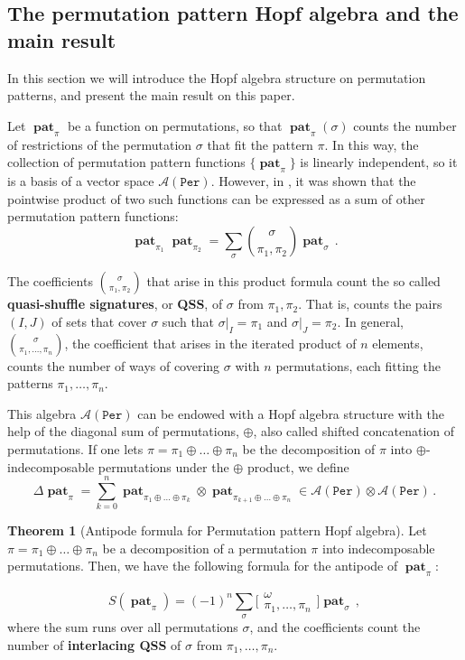 \documentclass[12pt, reqno]{amsart}
\theoremstyle{definition}
\newtheorem{thm}{Theorem}[section]
\DeclareMathOperator{\pat}{\mathbf{pat}}
\begin{document}
\subsection{The permutation pattern Hopf algebra and the main result}

In this section we will introduce the Hopf algebra structure on permutation patterns, and present the main result on this paper.

Let $\pat_{\pi}$ be a function on permutations, so that $\pat_{\pi}(\sigma)$ counts the number of restrictions of the permutation $\sigma$ that fit the pattern $\pi$.
In this way, the collection of permutation pattern functions $\{\pat_{\pi}\}$ is linearly independent, so it is a basis of a vector space $\mathcal A (\mathtt{Per})$.
However, in \cite{Vargas}, it was shown that the pointwise product of two such functions can be expressed as a sum of other permutation pattern functions:
$$\pat_{\pi_1} \pat_{\pi_2} = \sum_{\sigma} \binom{\sigma}{\pi_1, \pi_2} \pat_{\sigma} \, .$$

The coefficients $\binom{\sigma}{\pi_1, \pi_2}$ that arise in this product formula count the so called \textbf{quasi-shuffle signatures}, or \textbf{QSS}, of $\sigma$ from $\pi_1, \pi_2$.
That is, counts the pairs $(I, J)$ of sets that cover $\sigma$ such that $\sigma|_I = \pi_1$ and $\sigma|_J = \pi_2$.
In general, $\binom{\sigma}{\pi_1, \dots, \pi_n}$, the coefficient that arises in the iterated product of $n$ elements, counts the number of ways of covering $\sigma$ with $n$ permutations, each fitting the patterns $\pi_1, \dots, \pi_n$.

This algebra $\mathcal A(\mathtt{Per})$ can be endowed with a Hopf algebra structure with the help of the diagonal sum of permutations, $\oplus$, also called shifted concatenation of permutations.
If one lets $\pi = \pi_1 \oplus \dots \oplus \pi_n$ be the decomposition of $\pi$ into $\oplus$-indecomposable permutations under the $\oplus$ product, we define
$$\Delta \pat_{\pi} = \sum_{k=0}^n \pat_{\pi_1\oplus \dots \oplus \pi_k} \otimes \pat_{\pi_{k+1}\oplus \dots \oplus \pi_n} \in \mathcal A (\mathtt{Per}) \otimes \mathcal A (\mathtt{Per})\, .$$

\begin{thm}[Antipode formula for Permutation pattern Hopf algebra]\label{thm:antipode_perms_intro}
Let $\pi = \pi_1\oplus \dots \oplus \pi_n$ be a decomposition of a permutation $\pi$ into indecomposable permutations.
Then, we have the following formula for the antipode of $\pat_{\pi}$:

$$S(\pat_{\pi}) = (-1)^n \sum_{\sigma} \bigl[\!\begin{smallmatrix} \omega \\ \pi_1, \dots, \pi_n \end{smallmatrix}\!\bigr] \pat_{\sigma}\, ,$$
where the sum runs over all permutations $\sigma$, and the coefficients count the number of \textbf{interlacing QSS} of $\sigma$ from $\pi_1, \dots, \pi_n$.
\end{thm}
\end{document}
